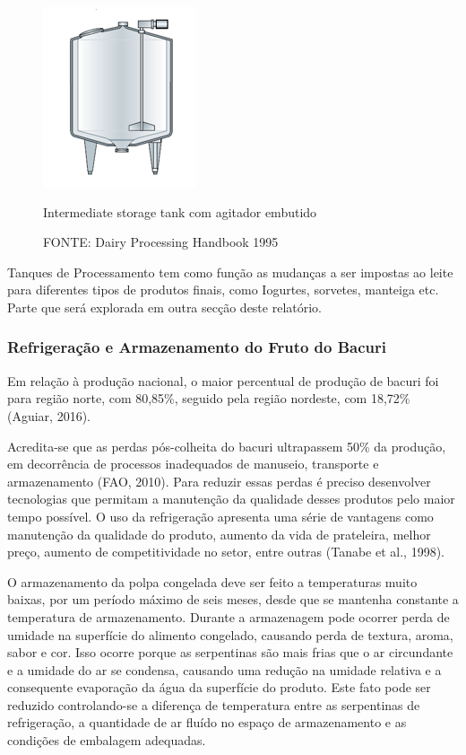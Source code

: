 \documentclass[10pt,a4paper]{article}
\begin{document}
\begin{figure}[H]
    \centering
    \includegraphics[scale=0.9]{Figuras/tanque2.png}
    \caption{Intermediate storage tank com agitador embutido}
    \caption*{FONTE: Dairy Processing Handbook 1995}
    \label{fig_tanque2}
\end{figure}


Tanques de Processamento tem como função as mudanças a ser impostas ao leite para diferentes tipos de produtos finais, como Iogurtes, sorvetes, manteiga etc. Parte que será explorada em outra secção deste relatório.


\subsubsection{{Refrigeração e Armazenamento do Fruto do Bacuri }}


Em relação à produção nacional, o maior percentual de produção de bacuri foi para região norte, com 80,85\%, seguido pela região nordeste, com 18,72\% (Aguiar, 2016). 

Acredita-se que as perdas pós-colheita do bacuri ultrapassem 50\% da produção, em decorrência de processos inadequados de manuseio, transporte e armazenamento (FAO, 2010). Para reduzir essas perdas é preciso desenvolver tecnologias que permitam a manutenção da qualidade desses produtos pelo maior tempo possível. O uso da refrigeração apresenta uma série de vantagens como manutenção da qualidade do produto, aumento da vida de prateleira, melhor preço, aumento de competitividade no setor, entre outras (Tanabe et al., 1998).

O armazenamento da polpa congelada deve ser feito a temperaturas muito baixas, por um período máximo de seis meses, desde que se mantenha constante a temperatura de armazenamento. Durante a armazenagem pode ocorrer perda de umidade na superfície do alimento congelado, causando perda de textura, aroma, sabor e cor. Isso ocorre porque as serpentinas são mais frias que o ar circundante e a umidade do ar se condensa, causando uma redução na umidade relativa e a consequente evaporação da água da superfície do produto. Este fato pode ser reduzido controlando-se a diferença de temperatura entre as serpentinas de refrigeração, a quantidade de ar fluído no espaço de armazenamento e as condições de embalagem adequadas.
\end{document}
